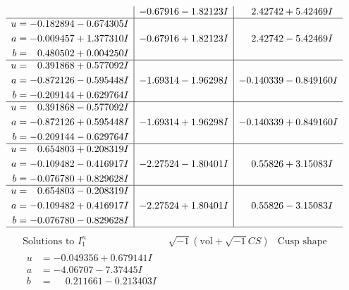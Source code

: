 \documentclass[1p]{elsarticle_modified}
\theoremstyle{definition}
\newcommand{\I}{\sqrt{-1}}
\begin{document}
$$\begin{array}{c|c|c}
 & -0.67916 - 1.82123 I & \phantom{-}2.42742 + 5.42469 I \\ \hline\begin{aligned}
u &= -0.182894 - 0.674305 I \\
a &= -0.009457 + 1.377310 I \\
b &= \phantom{-}0.480502 + 0.004250 I\end{aligned}
 & -0.67916 + 1.82123 I & \phantom{-}2.42742 - 5.42469 I \\ \hline\begin{aligned}
u &= \phantom{-}0.391868 + 0.577092 I \\
a &= -0.872126 - 0.595448 I \\
b &= -0.209144 + 0.629764 I\end{aligned}
 & -1.69314 - 1.96298 I & -0.140339 - 0.849160 I \\ \hline\begin{aligned}
u &= \phantom{-}0.391868 - 0.577092 I \\
a &= -0.872126 + 0.595448 I \\
b &= -0.209144 - 0.629764 I\end{aligned}
 & -1.69314 + 1.96298 I & -0.140339 + 0.849160 I \\ \hline\begin{aligned}
u &= \phantom{-}0.654803 + 0.208319 I \\
a &= -0.109482 - 0.416917 I \\
b &= -0.076780 + 0.829628 I\end{aligned}
 & -2.27524 - 1.80401 I & \phantom{-}0.55826 + 3.15083 I \\ \hline\begin{aligned}
u &= \phantom{-}0.654803 - 0.208319 I \\
a &= -0.109482 + 0.416917 I \\
b &= -0.076780 - 0.829628 I\end{aligned}
 & -2.27524 + 1.80401 I & \phantom{-}0.55826 - 3.15083 I\\
 \hline 
 \end{array}$$\newpage$$\begin{array}{c|c|c}  
\text{Solutions to }I^u_{1}& \I (\text{vol} + \sqrt{-1}CS) & \text{Cusp shape}\\
 \hline 
\begin{aligned}
u &= -0.049356 + 0.679141 I \\
a &= -4.06707 - 7.37445 I \\
b &= \phantom{-}0.211661 - 0.213403 I\end{aligned}

\end{array}$$
\end{document}
